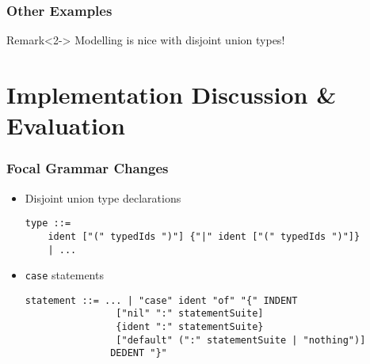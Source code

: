 \documentclass{beamer}
\begin{document}
\begin{frame}
\frametitle{Other Examples}
    
\usebox{\exampleImagination}

\begin{block}{Remark}<2->
Modelling is nice with disjoint union types!
\end{block}
\end{frame}

\section{Implementation Discussion \& Evaluation}

\begin{frame}[fragile]
\frametitle{Focal Grammar Changes}

\begin{itemize}
 \item<1-> Disjoint union type declarations
    {\small \begin{verbatim}
type ::=
    ident ["(" typedIds ")"] {"|" ident ["(" typedIds ")"]} 
    | ...
            \end{verbatim}}

 \item<2-> \texttt{case} statements
{\small \begin{verbatim}
statement ::= ... | "case" ident "of" "{" INDENT 
                ["nil" ":" statementSuite] 
                {ident ":" statementSuite} 
                ["default" (":" statementSuite | "nothing")] 
               DEDENT "}"
    \end{verbatim}}

\end{itemize}

\end{frame}
\end{document}

